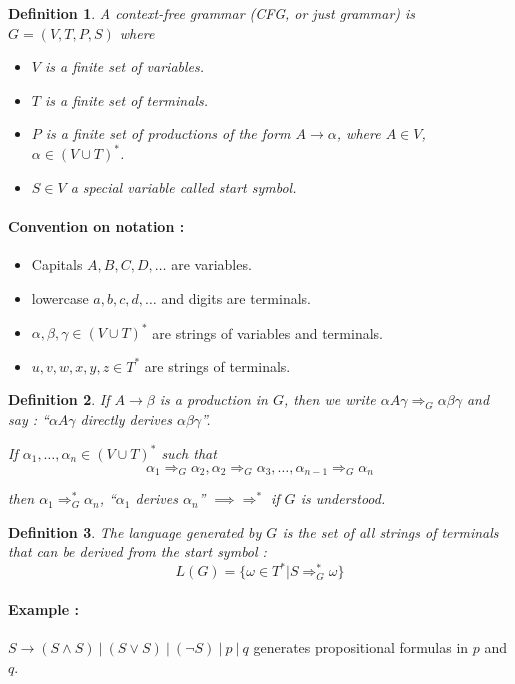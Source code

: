 \documentclass[a4paper,11pt]{article}
\newtheorem{mydef}{Definition}
\begin{document}
\begin{mydef}
  A context-free grammar (CFG, or just grammar) is $G = (V,T,P,S)$ where
  \begin{itemize}
  \item $V$ is a finite set of variables.
  \item $T$ is a finite set of terminals.
  \item $P$ is a finite set of productions of the form $A \to \alpha$, where $A
    \in V$, $\alpha \in (V \cup T)^*$.
  \item $S \in V$ a special variable called start symbol.
  \end{itemize}
\end{mydef}

\paragraph{Convention on notation : }
\begin{itemize}
\item Capitals $A,B,C,D,\dots$ are variables.
\item lowercase $a,b,c,d,\dots$ and digits are terminals.
\item $\alpha,\beta,\gamma \in (V \cup T)^*$ are strings of variables and terminals.
\item $u,v,w,x,y,z \in T^*$ are strings of terminals.
\end{itemize}

\begin{mydef}
  If $A \to \beta$ is a production in $G$, then we write $\alpha A \gamma
  \Rightarrow_{G} \alpha \beta \gamma$ and say : ``$\alpha A \gamma$ directly
  derives $\alpha \beta \gamma$''.

  If $\alpha_1,\dots,\alpha_n \in (V \cup T)^*$ such that
  \[
    \alpha_1 \Rightarrow_{G} \alpha_2, \alpha_2 \Rightarrow_{G} \alpha_3, \dots, \alpha_{n-1} \Rightarrow_{G} \alpha_n
  \]

  then $\alpha_1 \Rightarrow_G^* \alpha_n$, ``$\alpha_1$ derives $\alpha_n$''
  $\implies \Rightarrow^*$ if $G$ is understood.
\end{mydef}

\begin{mydef}
  The language generated by $G$ is the set of all strings of terminals that can
  be derived from the start symbol :
  \[
    L(G) = \{\omega \in T^* | S \Rightarrow_G^* \omega \}
  \]
\end{mydef}

\paragraph{Example : } $S \to (S \wedge S)\  |\  (S \vee S)\  |\  (\neg S)\  |\  p\  |\  q$
generates propositional formulas in $p$ and $q$.
\end{document}

